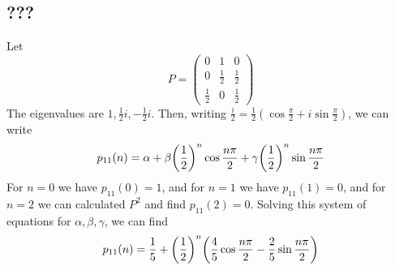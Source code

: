 \subsection{???}
\begin{example}
Let
\[ P = \begin{pmatrix}
0 & 1 & 0 \\
0 & \frac{1}{2} & \frac{1}{2} \\
\frac{1}{2} & 0 & \frac{1}{2}
\end{pmatrix} \]
The eigenvalues are \( 1, \frac{1}{2}i, -\frac{1}{2}i \).
Then, writing \( \frac{i}{2} = \frac{1}{2} (\cos \frac{\pi}{2} + i \sin \frac{\pi}{2} ) \), we can write
\[ p_{11}(n) = \alpha + \beta \qty(\frac{1}{2})^n \cos \frac{n \pi}{2} + \gamma \qty(\frac{1}{2})^n \sin \frac{n \pi}{2} \]
For \( n = 0 \) we have \( p_{11}(0) = 1 \), and for \( n = 1 \) we have \( p_{11}(1) = 0 \), and for \( n = 2 \) we can calculated \( P^2 \) and find \( p_{11}(2) = 0 \).
Solving this system of equations for \( \alpha, \beta, \gamma \), we can find
\[ p_{11}(n) = \frac{1}{5} + \qty(\frac{1}{2})^n \qty(\frac{4}{5}\cos \frac{n \pi}{2} - \frac{2}{5}\sin \frac{n \pi}{2} ) \]
\end{example}

